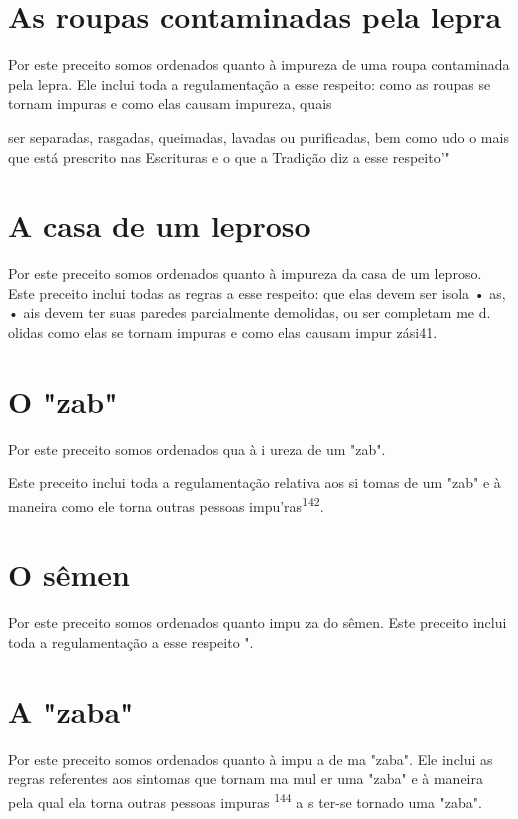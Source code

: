\begin{itemize}
\begin{enumrate}
\begin{itemize}
\begin{itemize}
\section{As roupas contaminadas pela lepra}

Por este preceito somos ordenados quanto à impureza de uma rou­pa
contaminada pela lepra. Ele inclui toda a regulamentação a esse
respeito: co­mo as roupas se tornam impuras e como elas causam impureza,
quais

ser separadas, rasgadas, queimadas, lavadas ou purificadas, bem como udo
o mais que está prescrito nas Escrituras e o que a Tradição diz a esse
respeito'"

\section{A casa de um leproso}

Por este preceito somos ordenados quanto à impureza da casa de um
leproso. Este preceito inclui todas as regras a esse respeito: que elas
devem ser isola • as, • ais devem ter suas paredes parcialmente
demolidas, ou ser com­pletam me d. olidas como elas se
tornam impuras e como elas causam impur zási41.

\section{O "zab"}

Por este preceito somos ordenados qua à i ureza de um "zab".

Este preceito inclui toda a regulamentação relativa aos si tomas de um
"zab" e à maneira como ele torna outras pessoas
impu'ras\textsuperscript{142}.

\section{O sêmen}

Por este preceito somos ordenados quanto impu za do sêmen. Este preceito
inclui toda a regulamentação a esse respeito ".

\section{A "zaba"}

Por este preceito somos ordenados quanto à impu a de ma "za­ba". Ele
inclui as regras referentes aos sintomas que tornam ma mul er uma "zaba"
e à maneira pela qual ela torna outras pessoas impuras
\textsuperscript{144} a s ter-se tornado uma "zaba".


\end{itemize}
\end{itemize}
\end{enumrate}
\end{itemize}
